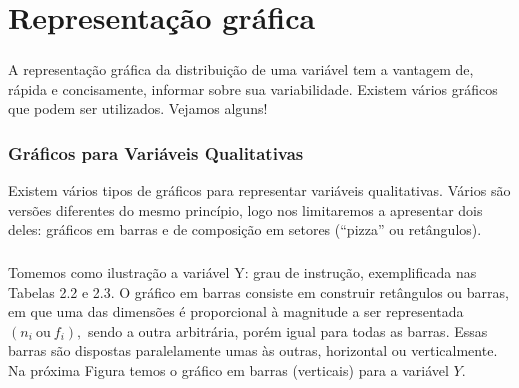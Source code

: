 \documentclass[14pt,aspectratio=1610]{beamer}
\begin{document}
\section{Representação gráfica}
\begin{frame}{}
\frametitle{}
\begin{block}{}
\justifying
A representação gráfica da distribuição de uma variável tem a vantagem de, rápida e concisamente, informar sobre sua variabilidade. Existem vários gráficos que podem ser utilizados. Vejamos alguns!
\end{block}
\end{frame}

\begin{frame}{}
\frametitle{Gráficos para Variáveis Qualitativas}
\begin{block}{}
\justifying
Existem vários tipos de gráficos para representar variáveis qualitativas. Vários são
versões diferentes do mesmo princípio, logo nos limitaremos a apresentar dois deles:
gráficos em barras e de composição em setores (“pizza” ou retângulos).
\end{block}
\end{frame}

\begin{frame}{}
\frametitle{}
\begin{block}{}
\justifying
Tomemos como ilustração a variável Y: grau de instrução, exemplificada
nas Tabelas 2.2 e 2.3. O gráfico em barras consiste em construir retângulos ou barras,
em que uma das dimensões é proporcional à magnitude a ser representada $(n_{i}\ \textrm{ou}\ f_{i}),$ sendo a outra arbitrária, porém igual para todas as barras. Essas barras são dispostas paralelamente umas às outras, horizontal ou verticalmente. Na próxima Figura temos o gráfico em barras (verticais) para a variável $Y.$
\end{block}
\end{frame}
\end{document}
